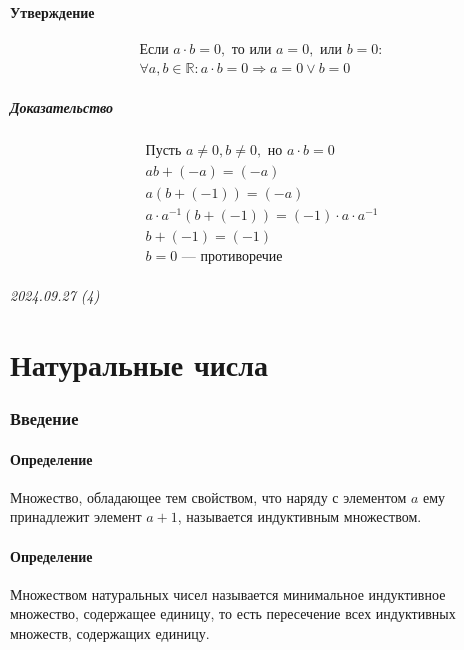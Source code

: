 \documentclass{article}
\begin{document}
\subsection{Утверждение}
\begin{gather*}
    \text{Если } a \cdot b = 0, \text{ то или } a = 0, \text{ или } b = 0: \\
    \forall a, b \in \mathbb{R}: a \cdot b = 0 \Rightarrow a = 0 \vee b = 0
\end{gather*}

\subsubsection{Доказательство}
\begin{gather*}
    \text{Пусть } a \neq 0, b \neq 0, \text{ но } a \cdot b = 0 \\
    ab + (-a) = (-a) \\
    a(b + (-1)) = (-a) \\
    a \cdot a^{-1} (b + (-1)) = (-1) \cdot a \cdot a^{-1} \\
    b + (-1) = (-1) \\
    b = 0 \text{ --- противоречие}
\end{gather*}




\newpage
\paragraph{2024.09.27 (4)}
\part{Натуральные числа}

\section{Введение}

\subsection{Определение}
Множество, обладающее тем свойством, что наряду с элементом $a$ ему принадлежит элемент $a + 1$, называется индуктивным множеством.


\subsection{Определение}
Множеством натуральных чисел называется минимальное индуктивное множество, содержащее единицу, то есть пересечение всех индуктивных множеств, содержащих единицу.
\end{document}
